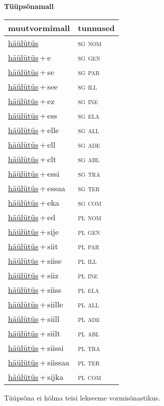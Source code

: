 
\vspace{1.8em}
\begin{minipage}{\textwidth}
\textbf{Tüüpsõnamall \,}\\

\begin{sideways}
\begin{tabular}{l l}
muutvormimall & tunnused \\
\hline
\underline{häülütüs} & \textsc{ sg nom } \\
\underline{häülütüs}\,+\,e & \textsc{ sg gen } \\
\underline{häülütüs}\,+\,se & \textsc{ sg par } \\
\underline{häülütüs}\,+\,see & \textsc{ sg ill } \\
\underline{häülütüs}\,+\,ez & \textsc{ sg ine } \\
\underline{häülütüs}\,+\,ess & \textsc{ sg ela } \\
\underline{häülütüs}\,+\,elle & \textsc{ sg all } \\
\underline{häülütüs}\,+\,ell & \textsc{ sg ade } \\
\underline{häülütüs}\,+\,elt & \textsc{ sg abl } \\
\underline{häülütüs}\,+\,essi & \textsc{ sg tra } \\
\underline{häülütüs}\,+\,essaa & \textsc{ sg ter } \\
\underline{häülütüs}\,+\,eka & \textsc{ sg com } \\
\underline{häülütüs}\,+\,ed & \textsc{ pl nom } \\
\underline{häülütüs}\,+\,sije & \textsc{ pl gen } \\
\underline{häülütüs}\,+\,siit & \textsc{ pl par } \\
\underline{häülütüs}\,+\,siise & \textsc{ pl ill } \\
\underline{häülütüs}\,+\,siiz & \textsc{ pl ine } \\
\underline{häülütüs}\,+\,siiss & \textsc{ pl ela } \\
\underline{häülütüs}\,+\,siille & \textsc{ pl all } \\
\underline{häülütüs}\,+\,siill & \textsc{ pl ade } \\
\underline{häülütüs}\,+\,siilt & \textsc{ pl abl } \\
\underline{häülütüs}\,+\,siissi & \textsc{ pl tra } \\
\underline{häülütüs}\,+\,siissaa & \textsc{ pl ter } \\
\underline{häülütüs}\,+\,sijka & \textsc{ pl com } \\
\end{tabular}
\end{sideways}
\label{tab:tüüpsõnamall-häülütüs}

\end{minipage}

 
\vspace{1em}
\noindent Tüüpsõna ei hõlma teisi lekseeme vormi\-sõnastikus.
